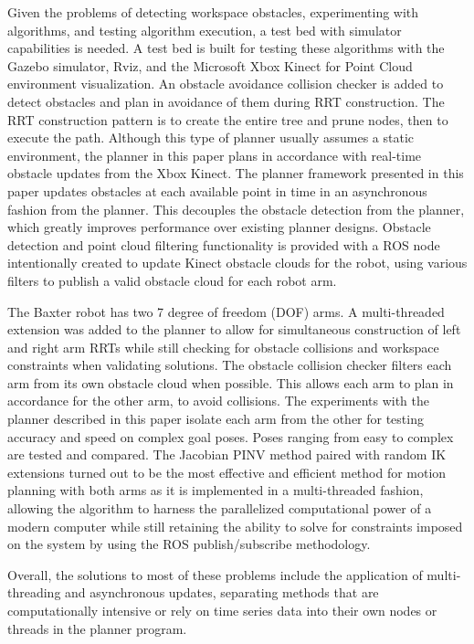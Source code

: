 \documentclass[conference]{IEEEtran} \usepackage[T1]{fontenc} \usepackage[backend=biber, style=ieee]{biblatex}
\begin{document}
Given the problems of detecting workspace obstacles, experimenting with algorithms, and testing algorithm execution, a test bed with simulator capabilities is needed. 
A test bed is built for testing these algorithms with the Gazebo simulator, Rviz, and the Microsoft Xbox Kinect for Point Cloud environment visualization. An 
obstacle avoidance collision checker is added to detect obstacles and plan in avoidance of them during RRT construction. The RRT construction pattern is to create the entire tree 
and prune nodes, then to execute the path. Although this type of planner usually assumes a static environment, the planner in this paper plans in accordance with real-time
obstacle updates from the Xbox Kinect. The planner framework presented in this paper updates obstacles at each available point in time in an asynchronous fashion from the planner. 
This decouples the obstacle detection from the planner, which greatly improves performance over existing planner designs. Obstacle detection and point cloud filtering functionality 
is provided with a ROS node intentionally created to update Kinect obstacle clouds for the robot, using various filters to publish a valid obstacle cloud for each robot arm.

The Baxter robot has two 7 degree of freedom (DOF) arms. A multi-threaded extension was added to the planner to allow for simultaneous construction of left and right arm
RRTs while still checking for obstacle collisions and workspace constraints when validating solutions. The obstacle collision checker filters 
each arm from its own obstacle cloud when possible. This allows each arm to plan in accordance for the other arm, to avoid collisions. The experiments 
with the planner described in this paper isolate each arm from the other for testing accuracy and speed on complex goal poses. Poses ranging from easy to 
complex are tested and compared. The Jacobian PINV method paired with random IK extensions turned out to be the most effective and efficient method for motion 
planning with both arms as it is implemented in a multi-threaded fashion, allowing the algorithm to harness the parallelized computational power of a modern computer
while still retaining the ability to solve for constraints imposed on the system by using the ROS publish/subscribe methodology.

Overall, the solutions to most of these problems include the application of multi-threading and asynchronous updates, separating methods that are computationally 
intensive or rely on time series data into their own nodes or threads in the planner program.
\end{document}
